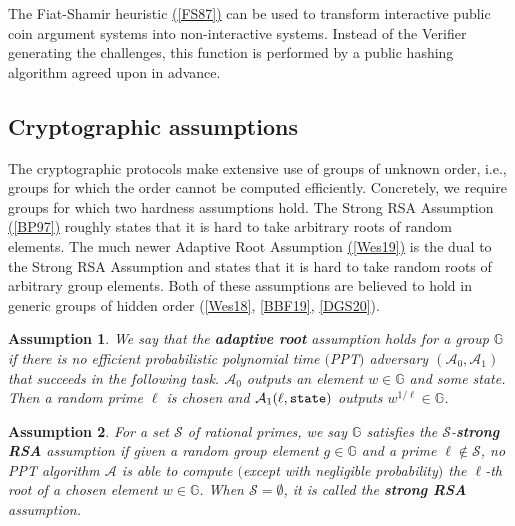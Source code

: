 \documentclass[11pt, lettersize, notitlepage, leqno, footskip=0.6cm]{article}
\newcommand{\bG}{\mathbb{G}}
\newcommand{\mc}{\mathcal}
\newcommand{\mb}{\mathbb}
\newcommand{\noin}{\noindent}
\newtheorem{Ass}{Assumption}[section]
\numberwithin{equation}{section}
\begin{document}
The Fiat-Shamir heuristic \hyperlink{FS87}{([FS87])} can be used to transform interactive public coin argument systems into non-interactive systems. Instead of the Verifier generating the challenges, this function is performed by a public hashing algorithm agreed upon in advance.




\subsection{\fontsize{11}{11}\selectfont Cryptographic assumptions}

\noin The cryptographic protocols make extensive use of groups of unknown order, i.e., groups for
which the order cannot be computed efficiently. Concretely, we require groups for which two hardness assumptions hold. The Strong RSA Assumption \hyperlink{BP97}{([BP97])} roughly states that it is hard to take arbitrary roots of random elements. The much newer Adaptive Root Assumption \hyperlink{Wes19}{([Wes19])} is the dual to the Strong RSA Assumption and states that it is hard to take random roots of arbitrary group elements. Both of these assumptions are believed to hold in generic groups of hidden order (\hyperlink{Wes19}{[Wes18]}, \hyperlink{BBF19}{[BBF19]}, \hyperlink{DGS20}{[DGS20]}).

\vspace{0.1cm}

\begin{Ass} We say that the \hypertarget{ARA}{\textbf{adaptive root} assumption} holds for a group $\mb{G}$ if there is no efficient probabilistic polynomial time $($PPT$)$ adversary $(\mc{A}_0, \mc{A}_1)$ that succeeds in the following task. $\mc{A}_0$ outputs an element $w\in \mb{G}$ and some state. Then a random prime $\ell$ is chosen and $\mc{A}_1(\ell, \tt{state})$ outputs $w^{1/\ell}\in \mb{G}$. \end{Ass}
 

\begin{Ass} For a set $\mc{S}$ of rational primes, we say $\mb{G}$ satisfies the $\mc{S}$-\textbf{strong RSA} assumption if given a random group element $g\in\bG$ and a prime $\ell\notin \mc{S}$, no PPT algorithm $\mc{A}$ is able to compute $($except with negligible probability$)$ the $\ell$-th root of a chosen element $w\in \mb{G}$. When $\mc{S} = \emptyset$, it is called the \hypertarget{RSA}{\textbf{strong RSA}} assumption.\end{Ass}
\end{document}
